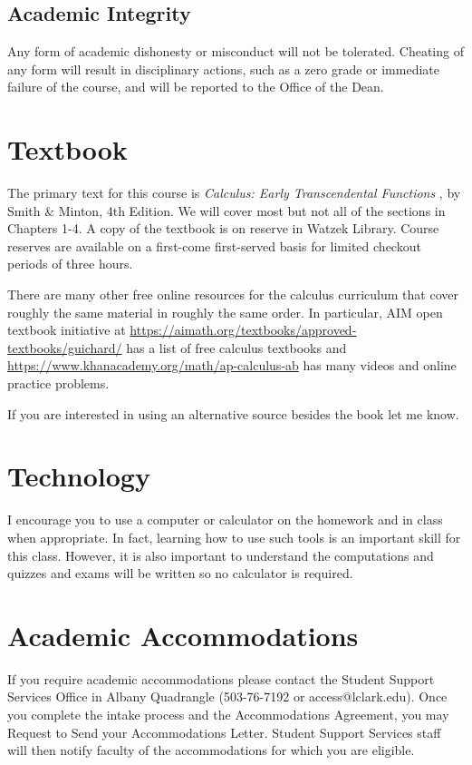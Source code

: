 \documentclass[11pt]{article}
\begin{document}
\subsection*{Academic Integrity}

Any form of academic dishonesty or misconduct will not be tolerated. Cheating of any form will result in disciplinary actions, such as a zero grade or immediate failure of the course, and will be reported to the Office of the Dean.

\section*{Textbook}

The primary text for this course is \emph{Calculus: Early Transcendental Functions }, by Smith \& Minton, 4th Edition. We will cover most but not all of the sections in Chapters 1-4. A copy of the textbook is on reserve in Watzek Library. Course reserves are available on a first-come first-served basis for limited checkout periods of three hours.

There are many other free online resources for the calculus curriculum that cover roughly the same material in roughly the same order. In particular, AIM open textbook initiative at \url{https://aimath.org/textbooks/approved-textbooks/guichard/} has a list of free calculus textbooks and \url{https://www.khanacademy.org/math/ap-calculus-ab} has many videos and online practice problems.

If you are interested in using an alternative source besides the book let me know.

\section*{Technology}

I encourage you to use a computer or calculator on the homework and in class when appropriate. In fact, learning how to use such tools is an important skill for this class. However, it is also important to understand the computations and quizzes and exams will be written so no calculator is required. 

\section*{Academic Accommodations}

If you require academic accommodations please contact the Student Support Services Office in Albany Quadrangle (503-76-7192 or access@lclark.edu).  Once you complete the intake process and the Accommodations Agreement, you may Request to Send your Accommodations Letter.  Student Support Services staff will then notify faculty of the accommodations for which you are eligible.
\end{document}
